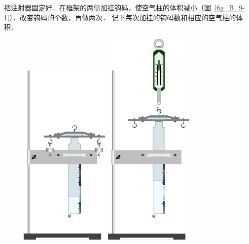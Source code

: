 把注射器固定好．在框架的两侧加挂钩码，使空气柱的体积减小（图~\ref{fig_B_9-1}）．改变钩码的个数，再做两次．
记下每次加挂的钩码数和相应的空气柱的体积．
\begin{figure}[htbp]
    \centering
    \begin{minipage}[t]{0.48\textwidth}
        \centering
        \includegraphics{fig/B/9-1.pdf}
        \caption{}\label{fig_B_9-1}
    \end{minipage}
    \begin{minipage}[t]{0.48\textwidth}
        \centering
        \includegraphics{fig/B/9-2.pdf}
        \caption{}\label{fig_B_9-2}
    \end{minipage}
\end{figure}


